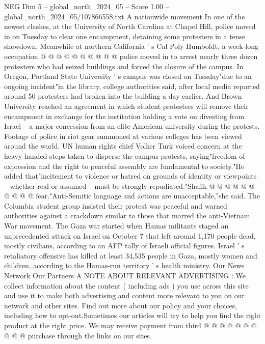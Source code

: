 \begin{textsample}{NEG Dim 5 – global\_north\_2024\_05 – Score 1.00 – global\_north\_2024\_05/107866558.txt}
A nationwide movement In one of the newest clashes, at the University of North Carolina at Chapel Hill, police moved in on Tuesday to clear one encampment, detaining some protesters in a tense showdown.
Meanwhile at northern California ' s Cal Poly Humboldt, a week-long occupation @ @ @ @ @ @ @ @ @ @ police moved in to arrest nearly three dozen protesters who had seized buildings and forced the closure of the campus.
In Oregon, Portland State University ' s campus was closed on Tuesday"due to an ongoing incident"in the library, college authorities said, after local media reported around 50 protesters had broken into the building a day earlier.
And Brown University reached an agreement in which student protesters will remove their encampment in exchange for the institution holding a vote on divesting from Israel -- a major concession from an elite American university during the protests.
Footage of police in riot gear summoned at various colleges has been viewed around the world.
UN human rights chief Volker Turk voiced concern at the heavy-handed steps taken to disperse the campus protests, saying"freedom of expression and the right to peaceful assembly are fundamental to society."He added that"incitement to violence or hatred on grounds of identity or viewpoints -- whether real or assumed -- must be strongly repudiated."Shafik @ @ @ @ @ @ @ @ @ @ fear."Anti-Semitic language and actions are unacceptable,"she said.
The Columbia student group insisted their protest was peaceful and warned authorities against a crackdown similar to those that marred the anti-Vietnam War movement.
The Gaza war started when Hamas militants staged an unprecedented attack on Israel on October 7 that left around 1,170 people dead, mostly civilians, according to an AFP tally of Israeli official figures.
Israel ' s retaliatory offensive has killed at least 34,535 people in Gaza, mostly women and children, according to the Hamas-run territory ' s health ministry.
Our News Network Our Partners A NOTE ABOUT RELEVANT ADVERTISING : We collect information about the content ( including ads ) you use across this site and use it to make both advertising and content more relevant to you on our network and other sites.
Find out more about our policy and your choices, including how to opt-out.Sometimes our articles will try to help you find the right product at the right price.
We may receive payment from third @ @ @ @ @ @ @ @ @ @ purchase through the links on our sites.

\end{textsample}
